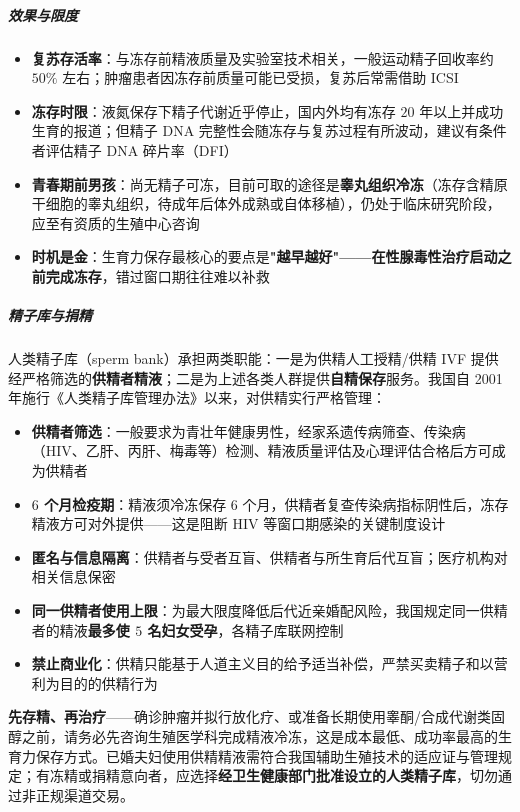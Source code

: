 \documentclass[12pt,a4paper,twoside]{ctexbook}
\begin{document}
\subparagraph{效果与限度}

\begin{itemize}
	\item \textbf{复苏存活率}：与冻存前精液质量及实验室技术相关，一般运动精子回收率约 $50\%$ 左右；肿瘤患者因冻存前质量可能已受损，复苏后常需借助 ICSI
	\item \textbf{冻存时限}：液氮保存下精子代谢近乎停止，国内外均有冻存 $20$ 年以上并成功生育的报道；但精子 DNA 完整性会随冻存与复苏过程有所波动，建议有条件者评估精子 DNA 碎片率（DFI）
	\item \textbf{青春期前男孩}：尚无精子可冻，目前可取的途径是\textbf{睾丸组织冷冻}（冻存含精原干细胞的睾丸组织，待成年后体外成熟或自体移植），仍处于临床研究阶段，应至有资质的生殖中心咨询
	\item \textbf{时机是金}：生育力保存最核心的要点是\textbf{"越早越好"——在性腺毒性治疗启动之前完成冻存}，错过窗口期往往难以补救
\end{itemize}

\subparagraph{精子库与捐精}

人类精子库（sperm bank）承担两类职能：一是为供精人工授精/供精 IVF 提供经严格筛选的\textbf{供精者精液}；二是为上述各类人群提供\textbf{自精保存}服务。我国自 2001 年施行《人类精子库管理办法》以来，对供精实行严格管理：

\begin{itemize}
	\item \textbf{供精者筛选}：一般要求为青壮年健康男性，经家系遗传病筛查、传染病（HIV、乙肝、丙肝、梅毒等）检测、精液质量评估及心理评估合格后方可成为供精者
	\item \textbf{$6$ 个月检疫期}：精液须冷冻保存 $6$ 个月，供精者复查传染病指标阴性后，冻存精液方可对外提供——这是阻断 HIV 等窗口期感染的关键制度设计
	\item \textbf{匿名与信息隔离}：供精者与受者互盲、供精者与所生育后代互盲；医疗机构对相关信息保密
	\item \textbf{同一供精者使用上限}：为最大限度降低后代近亲婚配风险，我国规定同一供精者的精液\textbf{最多使 $5$ 名妇女受孕}，各精子库联网控制
	\item \textbf{禁止商业化}：供精只能基于人道主义目的给予适当补偿，严禁买卖精子和以营利为目的的供精行为
\end{itemize}

\begin{tcolorbox}[colback=pink!5!white,colframe=red!50!black,title=贴心小叮咛]
\textbf{先存精、再治疗}——确诊肿瘤并拟行放化疗、或准备长期使用睾酮/合成代谢类固醇之前，请务必先咨询生殖医学科完成精液冷冻，这是成本最低、成功率最高的生育力保存方式。已婚夫妇使用供精精液需符合我国辅助生殖技术的适应证与管理规定；有冻精或捐精意向者，应选择\textbf{经卫生健康部门批准设立的人类精子库}，切勿通过非正规渠道交易。
\end{tcolorbox}
\end{document}

